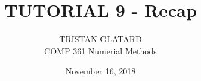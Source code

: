  

 

\title{TUTORIAL 9 - Recap}%
\author{TRISTAN GLATARD\\ %
COMP 361 Numerial Methods} %
\date{November 16, 2018} 
\maketitle

